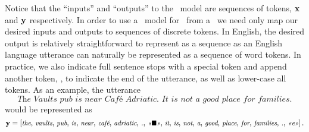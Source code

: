 Notice that the ``inputs'' and ``outputs'' to the \sequencetosequence~model are sequences of tokens, 
$\mathbf{x}$ and $\mathbf{y}$ respectively.
In order to use a \sequencetosequence~model for \naturallanguagegeneration~from a 
\meaningrepresentation~we need only map our desired inputs and outputs to sequences of discrete tokens. In English, the desired output is relatively straightforward to represent as 
a sequence as an English language 
utterance can naturally be represented as a sequence of word tokens. In practice, we also indicate full sentence stops with a special token \senttok and append another token, \stoptok, to indicate the 
end of the utterance, as well as lower-case all tokens. As an example, the utterance 
\[\textit{The Vaults pub is near Caf{\'e} Adriatic. It is not a good place for families.} \]
would be represented as 
\[\small \mathbf{y} = \left[ \textit{the},\,\textit{vaults},\,\textit{pub},\,\textit{is},\,\textit{near},\,\textit{caf{\'e}},\,\textit{adriatic},\,\textit{.},\,\textit{\textit{<<$\blacksquare$>>}},\,\textit{it},\,\textit{is},\,\textit{not},\,\textit{a},\,\textit{good},\,\textit{place},\,\textit{for},\,\textit{families},\,\textit{.},\,\textit{\textit{<<e>>}}\right]. \]

